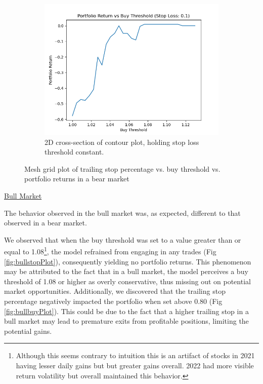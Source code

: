 \documentclass{article}
\begin{document}
\begin{figure}[H]
\begin{subfigure}{0.495\textwidth}
        \includegraphics[width=\linewidth]{stopSlice.png}
        \caption{2D cross-section of contour plot, holding stop loss threshold constant.}
        \label{fig:stopPlot}
    \end{subfigure}
    \caption{Mesh grid plot of trailing stop percentage vs. buy threshold vs. portfolio returns in a bear market}

\end{figure}

\underline{Bull Market}

The behavior observed in the bull market was, as expected, different to that observed in a bear market.

We observed that when the buy threshold was set to a value greater than or equal to 1.08\footnote{Although this seems contrary to intuition this is an artifact of stocks in 2021 having lesser daily gains but but greater gains overall. 2022 had more visible return volatility but overall maintained this behavior.}, the model refrained from engaging in any trades (Fig \ref{fig:bullstopPlot}), consequently yielding no portfolio returns. This phenomenon may be attributed to the fact that in a bull market, the model perceives a buy threshold of 1.08 or higher as overly conservative, thus missing out on potential market opportunities. Additionally, we discovered that the trailing stop percentage negatively impacted the portfolio when set above 0.80 (Fig \ref{fig:bullbuyPlot}). This could be due to the fact that a higher trailing stop in a bull market may lead to premature exits from profitable positions, limiting the potential gains.
\end{document}
